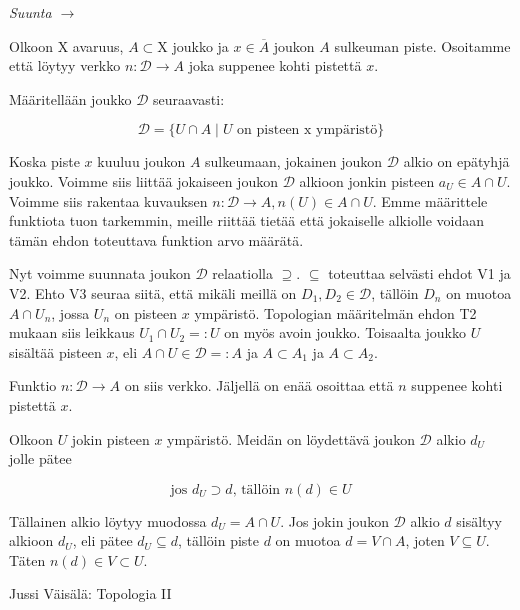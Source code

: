 \documentclass[12pt,a4paper,leqno]{report}
\newcommand{\X}{\mathrm{X}}
\newcommand{\D}{\mathcal{D}}
\theoremstyle{plain}
\theoremstyle{definition}
\theoremstyle{remark}
\begin{document}
\emph{Suunta $\to$}

Olkoon $\X$ avaruus, $A \subset \X$ joukko ja $x \in \overline{A}$ joukon $A$ sulkeuman piste. Osoitamme että löytyy verkko $n : \D \to A$ joka suppenee kohti pistettä $x$.

Määritellään joukko $\D$ seuraavasti:

\begin{equation}
\D = \{U \cap A \mid U \text{ on pisteen x ympäristö}\}
\end{equation}

Koska piste $x$ kuuluu joukon $A$ sulkeumaan, jokainen joukon $\D$ alkio on epätyhjä joukko. Voimme siis liittää jokaiseen joukon $\D$ alkioon jonkin pisteen $a_U \in A \cap U$. Voimme siis rakentaa kuvauksen $n : \D \to A, n(U) \in A \cap U$. Emme määrittele funktiota tuon tarkemmin, meille riittää tietää että jokaiselle alkiolle voidaan tämän ehdon toteuttava funktion arvo määrätä.

Nyt voimme suunnata joukon $\D$ relaatiolla $\supseteq$. $\subseteq$ toteuttaa selvästi ehdot V1 ja V2. Ehto V3 seuraa siitä, että mikäli meillä on $D_1, D_2 \in \D$, tällöin $D_n$ on muotoa $A \cap U_n$, jossa $U_n$ on pisteen $x$ ympäristö. Topologian määritelmän ehdon T2 mukaan siis leikkaus $U_1 \cap U_2 =: U$ on myös avoin joukko. Toisaalta joukko $U$ sisältää pisteen $x$, eli $A \cap U \in \D =: A$ ja $A \subset A_1$ ja $A \subset A_2$.

Funktio $n : \D \to A$ on siis verkko. Jäljellä on enää osoittaa että $n$ suppenee kohti pistettä $x$.

Olkoon $U$ jokin pisteen $x$ ympäristö. Meidän on löydettävä joukon $\D$ alkio $d_U$ jolle pätee

\begin{equation}
\text{jos } d_U \supset d \text{, tällöin } n(d) \in U
\end{equation}

Tällainen alkio löytyy muodossa $d_U = A \cap U$. Jos jokin joukon $\D$ alkio $d$ sisältyy alkioon $d_U$, eli pätee $d_U \subseteq d$, tällöin piste $d$ on muotoa $d = V \cap A$, joten $V \subseteq U$. Täten $n(d) \in V \subset U$.

\begin{thebibliography}{9}

Jussi Väisälä: Topologia II
\end{thebibliography}
\end{document}

